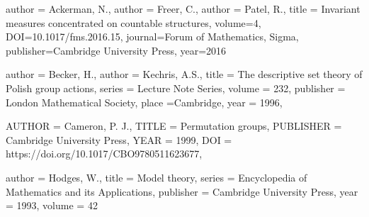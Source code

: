 \documentclass[11pt]{amsart}
\theoremstyle{plain}
\theoremstyle{definition}
\begin{document}
\begin{bibdiv}
\begin{biblist}[\normalsize]

{
author = {Ackerman, N.},
author = {Freer, C.},
author = {Patel, R.},
title = {Invariant measures concentrated on countable structures},
volume={4},
DOI={10.1017/fms.2016.15}, 
journal={Forum of Mathematics, Sigma}, 
publisher={Cambridge University Press}, 
year={2016}
}









{
author = {Becker, H.},
author = {Kechris, A.S.},
title = {The descriptive set theory of Polish group actions},
series = {Lecture Note Series},
volume = {232},
publisher = {London Mathematical Society},
place ={Cambridge},
year = {1996},
}

    {AUTHOR = {Cameron, P. J.},
     TITLE = {Permutation groups},
 PUBLISHER = {Cambridge University Press},
      YEAR = {1999},
       DOI = {https://doi.org/10.1017/CBO9780511623677},
}




{
author = {Hodges, W.},
title = {Model theory},
series = {Encyclopedia of Mathematics and its Applications},
publisher = {Cambridge University Press},
year = {1993},
volume = {42}
}




\end{biblist}
\end{bibdiv}
\end{document}
